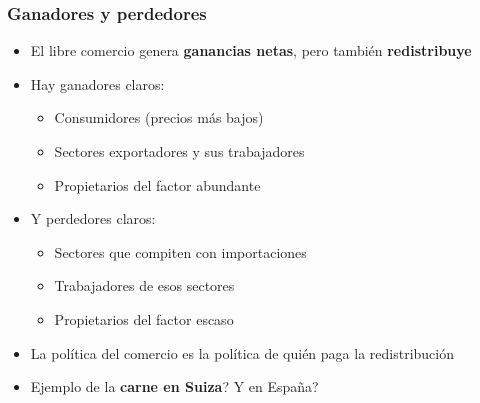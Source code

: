 \note{}
  



\begin{frame}
\frametitle{Ganadores y perdedores}
\centering

\begin{itemize}
  \item El libre comercio genera \textbf{ganancias netas}, pero también \textbf{redistribuye}
  \item<2-> Hay ganadores claros:
  \begin{itemize}
    \item Consumidores (precios más bajos)
    \item Sectores exportadores y sus trabajadores
    \item Propietarios del factor abundante
  \end{itemize}
  \item<3-> Y perdedores claros:
  \begin{itemize}
    \item Sectores que compiten con importaciones
    \item Trabajadores de esos sectores
    \item Propietarios del factor escaso
  \end{itemize}
  \item<4-> La política del comercio es la política de \alert{quién paga la redistribución}
  \item<5-> Ejemplo de la \textbf{carne en Suiza}? Y en España?
\end{itemize}

\end{frame}

